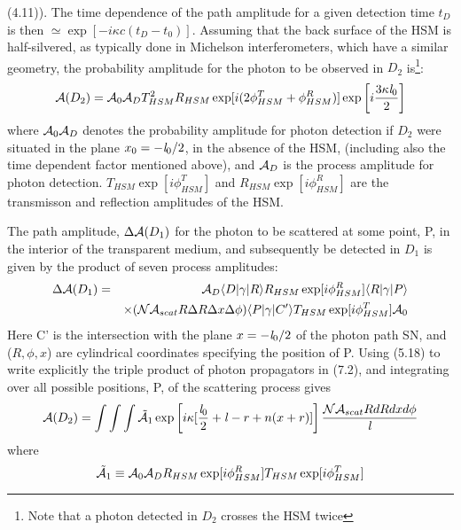 {    (4.11)). The time dependence of the path amplitude for a given detection time $t_D$ is then
    $\simeq \exp[-i \kappa c(t_D-t_0)]$. Assuming that the back surface of the HSM is half-silvered, as typically
   done in Michelson interferometers, which have a similar geometry, the probability amplitude for the 
  photon to be observed in $D_2$ is\footnote{Note that a photon detected in $D_2$ crosses the HSM twice}:
   \begin{equation}
   {\cal A}(D_2) = {\cal A}_0 {\cal A}_D T_{HSM}^2 R_{HSM}\exp[i(2\phi_{HSM}^T+\phi_{HSM}^R)]
    \exp\left[i\frac{3 \kappa {\it l}_0}{2}\right]
   \end{equation} 
   where ${\cal A}_0 {\cal A}_D $ denotes the probability amplitude for photon
   detection if  $D_2$ were situated in the plane $x_0 = - {\it l}_0/2$, in
   the absence of the HSM, (including also the time dependent factor mentioned above),
    and ${\cal A}_D$ is the process amplitude
   for photon detection. $T_{HSM}\exp[i\phi_{HSM}^T]$ and  $R_{HSM}\exp[i\phi_{HSM}^R]$
    are the transmisson and reflection amplitudes of the HSM. 
   \par The path amplitude, $\Delta {\cal A}(D_1)$  for the photon to be scattered at some point, P,
   in the interior of
   the transparent medium, and subsequently be detected in $D_1$ is given by the product of
    seven process amplitudes:
   \begin{eqnarray}
  \Delta {\cal A}(D_1) & = &   {\cal A}_D \langle D|\gamma|R \rangle R_{HSM}\exp[i\phi_{HSM}^R]
      \langle R|\gamma|P\rangle \nonumber \\
      &  & \times ({\cal N} {\cal A}_{scat} R \Delta R \Delta x \Delta \phi) \langle P|\gamma|C'\rangle
      T_{HSM}\exp[i\phi_{HSM}^T]{\cal A}_0
      \end{eqnarray}
       Here C' is the intersection with the plane $x = -{\it l}_0/2$ of the photon path SN, and ($R,\phi, x$) 
    are cylindrical coordinates specifying the position of P. Using (5.18) to write explicitly the triple
   product of photon propagators in (7.2), and integrating over all possible positions, P, of
   the scattering process  gives
    \begin{equation}
  {\cal A}(D_2) = \int \int \int \tilde{ {\cal A}}_1 \exp \left[i \kappa[\frac{{\it l}_0}{2}+{\it l}- r +n(x+r)]\right]
         \frac{{\cal N} {\cal A}_{scat} R dR dx d\phi}{{\it l}}
   \end{equation}
    where
 \[ \tilde{ {\cal A}}_1 \equiv {\cal A}_0 {\cal A}_D R_{HSM} \exp[i\phi_{HSM}^R] T_{HSM}\exp[i\phi_{HSM}^T] \] 
}
